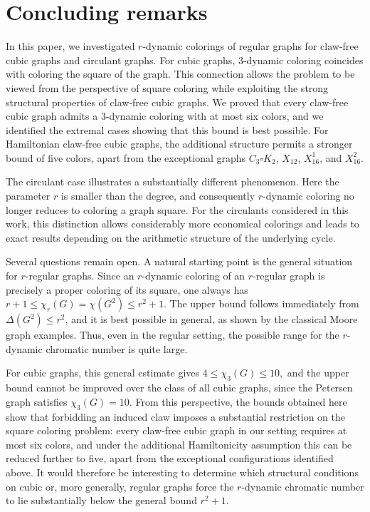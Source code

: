 \section{Concluding remarks}

In this paper, we investigated \(r\)-dynamic colorings of regular graphs for claw-free cubic graphs and circulant graphs. 
For cubic graphs, 3-dynamic coloring coincides with coloring the square of the graph. This connection allows the problem to be viewed from the perspective of square coloring while exploiting the strong structural properties of claw-free cubic graphs. We proved that every claw-free cubic graph admits a 3-dynamic coloring with at most six colors, and we identified the extremal cases showing that this bound is best possible. For Hamiltonian claw-free cubic graphs, the additional structure permits a stronger bound of five colors, apart from the exceptional graphs \(C_3\square K_2\), \(X_{12}\), \(X_{16}^{1}\), and \(X_{16}^{2}\).

The circulant case illustrates a substantially different phenomenon. Here the parameter \(r\) is smaller than the degree, and consequently \(r\)-dynamic coloring no longer reduces to coloring a graph square. For the circulants considered in this work, this distinction allows considerably more economical colorings and leads to exact results depending on the arithmetic structure of the underlying cycle.


Several questions remain open. A natural starting point is the general situation for \(r\)-regular graphs. Since an \(r\)-dynamic coloring of an \(r\)-regular graph is precisely a proper coloring of its square, one always has
$
r+1\leq \chi_r(G)=\chi(G^2)\leq r^2+1.
$
The upper bound follows immediately from \(\Delta(G^2)\leq r^2\), and it is best possible in general, as shown by the classical Moore graph examples. Thus, even in the regular setting, the possible range for the \(r\)-dynamic chromatic number is quite large.

For cubic graphs, this general estimate gives
$
4\leq \chi_3(G)\leq 10,
$
and the upper bound cannot be improved over the class of all cubic graphs, since the Petersen graph satisfies \(\chi_3(G)=10\). From this perspective, the bounds obtained here show that forbidding an induced claw imposes a substantial restriction on the square coloring problem: every claw-free cubic graph in our setting requires at most six colors, and under the additional Hamiltonicity assumption this can be reduced further to five, apart from the exceptional configurations identified above.
It would therefore be interesting to determine which structural conditions on cubic or, more generally, regular graphs force the \(r\)-dynamic chromatic number to lie substantially below the general bound \(r^2+1\). 